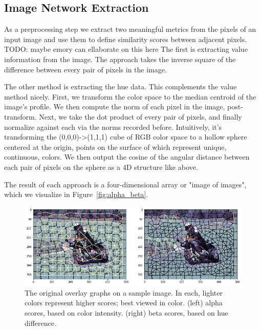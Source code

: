 \documentclass[twocolumn]{article}
\newcommand{\todo}[1]{}
\renewcommand{\todo}[1]{{\color{red} TODO: {#1}}}
\newcommand{\figref}[1]{Figure~\ref{fig:#1}}
\newcommand{\figlab}[1]{\label{fig:#1}}
\begin{document}
\subsection{Image Network Extraction}

As a preprocessing step we extract two meaningful metrics from the pixels of an
input image and use them to define similarity scores between adjacent pixels.
\todo{maybe emory can ellaborate on this here}
The first is extracting value information from the image.
The approach takes the inverse square of the difference between every pair of
pixels in the image. 

The other method is extracting the hue data. This complements the value method
nicely.  First, we transform the color space to the median centroid of the
image's profile. We then compute the norm of each pixel in the image,
post-transform.  Next, we take the dot product of every pair of pixels, and
finally normalize against each via the norms recorded before.  Intuitively, it's
transforming the (0,0,0)->(1,1,1) cube of RGB color space to a hollow sphere
centered at the origin, points on the surface of which represent unique,
continuous, colors. We then output the cosine of the angular distance between
each pair of pixels on the sphere as a 4D structure like above.

The result of each approach is a four-dimensional array or "image of
images", which we visualize in \figref{alpha_beta}.

\begin{figure}[t]
  \centering
  \includegraphics[width=\linewidth]{figs/ab_graphs.png}

  \caption{
    The original overlay graphs on a sample image. In each, lighter colors represent higher scores; best viewed in color.
    (left) alpha scores, based on color intensity. (right) beta scores, based on hue difference.
  }
  \figlab{ab_graph}

\end{figure}
\end{document}
